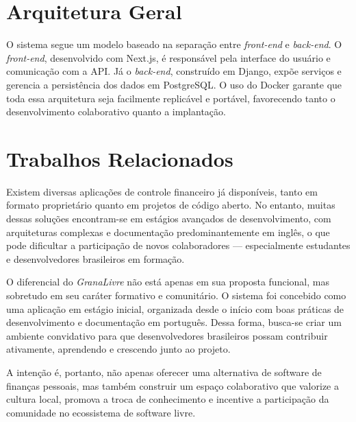 \section{Arquitetura Geral}
O sistema segue um modelo baseado na separação entre \textit{front-end} e \textit{back-end}. O \textit{front-end}, desenvolvido com Next.js, é responsável pela interface do usuário e comunicação com a API. Já o \textit{back-end}, construído em Django, expõe serviços e gerencia a persistência dos dados em PostgreSQL.  
O uso do Docker garante que toda essa arquitetura seja facilmente replicável e portável, favorecendo tanto o desenvolvimento colaborativo quanto a implantação.

\section{Trabalhos Relacionados}

Existem diversas aplicações de controle financeiro já disponíveis, tanto em formato proprietário quanto em projetos de código aberto. No entanto, muitas dessas soluções encontram-se em estágios avançados de desenvolvimento, com arquiteturas complexas e documentação predominantemente em inglês, o que pode dificultar a participação de novos colaboradores — especialmente estudantes e desenvolvedores brasileiros em formação.

O diferencial do \textit{GranaLivre} não está apenas em sua proposta funcional, mas sobretudo em seu caráter formativo e comunitário. O sistema foi concebido como uma aplicação em estágio inicial, organizada desde o início com boas práticas de desenvolvimento e documentação em português. Dessa forma, busca-se criar um ambiente convidativo para que desenvolvedores brasileiros possam contribuir ativamente, aprendendo e crescendo junto ao projeto.

A intenção é, portanto, não apenas oferecer uma alternativa de software de finanças pessoais, mas também construir um espaço colaborativo que valorize a cultura local, promova a troca de conhecimento e incentive a participação da comunidade no ecossistema de software livre.